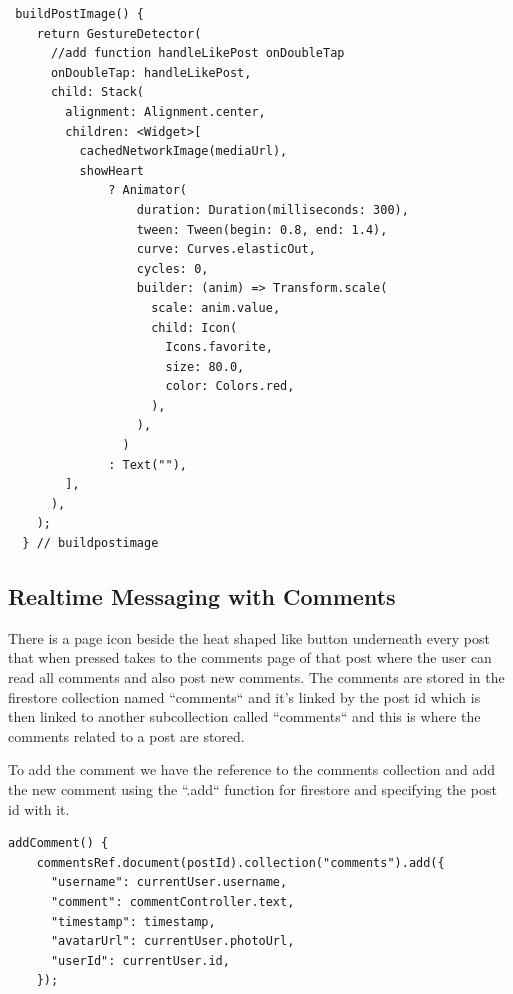 \begin{verbatim}
 buildPostImage() {
    return GestureDetector(
      //add function handleLikePost onDoubleTap
      onDoubleTap: handleLikePost,
      child: Stack(
        alignment: Alignment.center,
        children: <Widget>[
          cachedNetworkImage(mediaUrl),
          showHeart
              ? Animator(
                  duration: Duration(milliseconds: 300),
                  tween: Tween(begin: 0.8, end: 1.4),
                  curve: Curves.elasticOut,
                  cycles: 0,
                  builder: (anim) => Transform.scale(
                    scale: anim.value,
                    child: Icon(
                      Icons.favorite,
                      size: 80.0,
                      color: Colors.red,
                    ),
                  ),
                )
              : Text(""),
        ],
      ),
    );
  } // buildpostimage
\end{verbatim}
\subsection{Realtime Messaging with Comments}
There is a page icon beside the heat shaped like button underneath every post that when pressed takes to the comments page of that post where the user can read all comments and also post new comments. The comments are stored in the firestore collection named ``comments`` and it's linked by the post id which is then linked to another subcollection called ``comments`` and this is where the comments related to a post are stored.

To add the comment we have the reference to the comments collection and add the new comment using the ``.add`` function for firestore and specifying the post id with it.

\begin{verbatim}
addComment() {
    commentsRef.document(postId).collection("comments").add({
      "username": currentUser.username,
      "comment": commentController.text,
      "timestamp": timestamp,
      "avatarUrl": currentUser.photoUrl,
      "userId": currentUser.id,
    });
\end{verbatim}

